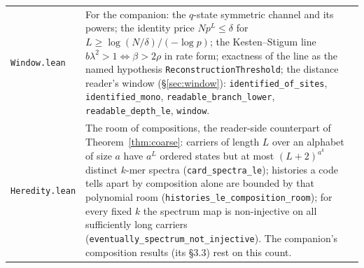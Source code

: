 \documentclass[11pt,reqno]{amsart}
\theoremstyle{plain}
\theoremstyle{definition}
\begin{document}
{\begin{longtable}{@{}>{\raggedright\arraybackslash}p{3.9cm}>{\raggedright\arraybackslash}p{9.7cm}@{}}
\texttt{Window.lean} & For the companion: the $q$-state symmetric channel and its powers; the identity price $Np^L\le\delta$ for $L\ge\log(N/\delta)/(-\log p)$; the Kesten--Stigum line $b\lambda^2>1\iff\beta>2\rho$ in rate form; exactness of the line as the named hypothesis \texttt{ReconstructionThreshold}; the distance reader's window (\S\ref{sec:window}): \texttt{identified\_\allowbreak{}of\_\allowbreak{}sites}, \texttt{identified\_\allowbreak{}mono}, \texttt{readable\_\allowbreak{}branch\_\allowbreak{}lower}, \texttt{readable\_\allowbreak{}depth\_\allowbreak{}le}, \texttt{window}. \\
\texttt{Heredity.lean} & The room of compositions, the reader-side counterpart of Theorem~\ref{thm:coarse}: carriers of length $L$ over an alphabet of size $a$ have $a^L$ ordered states but at most $(L+2)^{a^k}$ distinct $k$-mer spectra (\texttt{card\_\allowbreak{}spectra\_\allowbreak{}le}); histories a code tells apart by composition alone are bounded by that polynomial room (\texttt{histories\_\allowbreak{}le\_\allowbreak{}composition\_\allowbreak{}room}); for every fixed $k$ the spectrum map is non-injective on all sufficiently long carriers (\texttt{eventually\_\allowbreak{}spectrum\_\allowbreak{}not\_\allowbreak{}injective}). The companion's composition results (its \S3.3) rest on this count. \\
\bottomrule
\end{longtable}}
\end{document}
